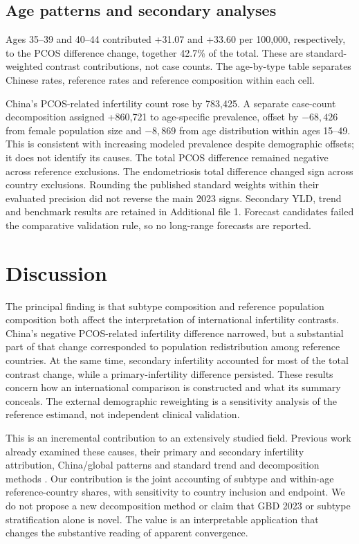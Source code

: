 \documentclass[11pt,a4paper]{article}
\begin{document}

\subsection{Age patterns and secondary analyses}
Ages 35--39 and 40--44 contributed +31.07 and +33.60 per 100,000, respectively, to the PCOS difference change, together 42.7\% of the total. These are standard-weighted contrast contributions, not case counts. The age-by-type table separates Chinese rates, reference rates and reference composition within each cell.

China's PCOS-related infertility count rose by 783,425. A separate case-count decomposition assigned +860,721 to age-specific prevalence, offset by $-68,426$ from female population size and $-8,869$ from age distribution within ages 15--49. This is consistent with increasing modeled prevalence despite demographic offsets; it does not identify its causes. The total PCOS difference remained negative across reference exclusions. The endometriosis total difference changed sign across country exclusions. Rounding the published standard weights within their evaluated precision did not reverse the main 2023 signs. Secondary YLD, trend and benchmark results are retained in Additional file 1. Forecast candidates failed the comparative validation rule, so no long-range forecasts are reported.

\section{Discussion}
The principal finding is that subtype composition and reference population composition both affect the interpretation of international infertility contrasts. China's negative PCOS-related infertility difference narrowed, but a substantial part of that change corresponded to population redistribution among reference countries. At the same time, secondary infertility accounted for most of the total contrast change, while a primary-infertility difference persisted. These results concern how an international comparison is constructed and what its summary conceals. The external demographic reweighting is a sensitivity analysis of the reference estimand, not independent clinical validation.

This is an incremental contribution to an extensively studied field. Previous work already examined these causes, their primary and secondary infertility attribution, China/global patterns and standard trend and decomposition methods \cite{xu,lu,wang,feng}. Our contribution is the joint accounting of subtype and within-age reference-country shares, with sensitivity to country inclusion and endpoint. We do not propose a new decomposition method or claim that GBD 2023 or subtype stratification alone is novel. The value is an interpretable application that changes the substantive reading of apparent convergence.
\end{document}
